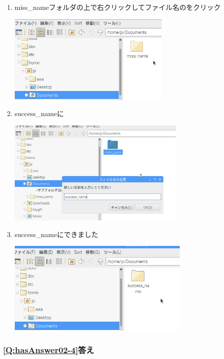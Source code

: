 \documentclass[a4paper,12pt]{jarticle}
\begin{document}
\begin{enumerate}
  \item
        miss\_nameフォルダの上で右クリックしてファイル名のをクリック

        \centering
        \includegraphics[width=7.913cm,height=4.344cm]{textbook-img214.png}
        \flushleft

  \item success\_nameに

        \centering
        \includegraphics[width=8.694cm,height=5.115cm]{textbook-img215.png}
        \flushleft
  \item success\_nameにできました

        \centering
        \includegraphics[width=8.895cm,height=4.542cm]{textbook-img216.png}
        \flushleft
\end{enumerate}



\subsubsection{\bfseries
\ref*{Q:hasAnswer02-4}答え}
\end{document}
